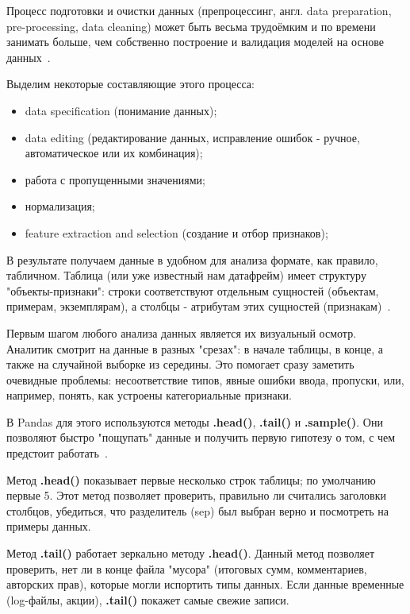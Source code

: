 \documentclass[pract]{SCWorks}
\begin{document}
Процесс подготовки и очистки данных (препроцессинг, англ. data preparation, pre-processing, data cleaning) 
может быть весьма трудоёмким и по времени занимать больше, чем собственно построение и валидация 
моделей на основе данных~\cite{kaggle-eda}. 

Выделим некоторые составляющие этого процесса:

\begin{itemize}
    \item data specification (понимание данных);
    \item data editing (редактирование данных, исправление ошибок - ручное, автоматическое или их комбинация);
    \item работа с пропущенными значениями;
    \item нормализация;
    \item feature extraction and selection (создание и отбор признаков);
\end{itemize}

В результате получаем данные в удобном для анализа формате, как правило, табличном. 
Таблица (или уже известный нам датафрейм) имеет структуру "объекты-признаки": строки соответствуют отдельным 
сущностей (объектам, примерам, экземплярам), а столбцы - атрибутам этих сущностей (признакам)~\cite{kaggle-eda}.

Первым шагом любого анализа данных является их визуальный осмотр. Аналитик смотрит на данные в разных "срезах": в начале таблицы, в конце, а 
также на случайной выборке из середины. Это помогает сразу заметить очевидные проблемы: несоответствие типов, 
явные ошибки ввода, пропуски, или, например, понять, как устроены категориальные признаки.

В Pandas для этого используются методы \textbf{.head()}, \textbf{.tail()} и \textbf{.sample()}. Они позволяют быстро 
"пощупать" данные и получить первую гипотезу о том, с чем предстоит работать~\cite{stepik,pandas-docs}.

Метод \textbf{.head()} показывает первые несколько строк таблицы; по умолчанию первые 5. 
Этот метод позволяет проверить, правильно ли считались заголовки столбцов, убедиться, что разделитель (sep) 
был выбран верно и посмотреть на примеры данных.

Метод \textbf{.tail()} работает зеркально методу \textbf{.head()}. Данный метод позволяет проверить, нет ли в конце 
файла "мусора" (итоговых сумм, комментариев, авторских прав), которые могли испортить типы данных.
Если данные временные (log-файлы, акции), \textbf{.tail()} покажет самые свежие записи.
\end{document}
